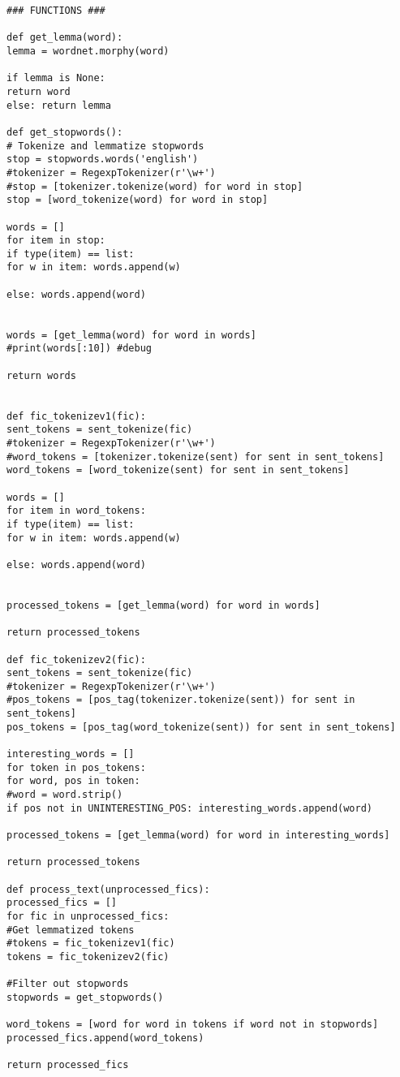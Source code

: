 \documentclass{pre-tfg}
\begin{document}
\begin{lstlisting}[style=consola]
### FUNCTIONS ###

def get_lemma(word):
lemma = wordnet.morphy(word)

if lemma is None:
return word
else: return lemma

def get_stopwords():
# Tokenize and lemmatize stopwords
stop = stopwords.words('english')
#tokenizer = RegexpTokenizer(r'\w+')
#stop = [tokenizer.tokenize(word) for word in stop]
stop = [word_tokenize(word) for word in stop]

words = []
for item in stop:
if type(item) == list: 
for w in item: words.append(w)

else: words.append(word)


words = [get_lemma(word) for word in words]
#print(words[:10]) #debug

return words


def fic_tokenizev1(fic):
sent_tokens = sent_tokenize(fic)
#tokenizer = RegexpTokenizer(r'\w+')
#word_tokens = [tokenizer.tokenize(sent) for sent in sent_tokens]
word_tokens = [word_tokenize(sent) for sent in sent_tokens]

words = []
for item in word_tokens:
if type(item) == list:
for w in item: words.append(w)

else: words.append(word)


processed_tokens = [get_lemma(word) for word in words]

return processed_tokens

def fic_tokenizev2(fic):
sent_tokens = sent_tokenize(fic)
#tokenizer = RegexpTokenizer(r'\w+')
#pos_tokens = [pos_tag(tokenizer.tokenize(sent)) for sent in sent_tokens]
pos_tokens = [pos_tag(word_tokenize(sent)) for sent in sent_tokens]

interesting_words = []
for token in pos_tokens:
for word, pos in token:
#word = word.strip()
if pos not in UNINTERESTING_POS: interesting_words.append(word)

processed_tokens = [get_lemma(word) for word in interesting_words]

return processed_tokens

def process_text(unprocessed_fics):
processed_fics = []
for fic in unprocessed_fics:
#Get lemmatized tokens
#tokens = fic_tokenizev1(fic)
tokens = fic_tokenizev2(fic)

#Filter out stopwords
stopwords = get_stopwords()

word_tokens = [word for word in tokens if word not in stopwords]
processed_fics.append(word_tokens)

return processed_fics



\end{lstlisting}
\end{document}
